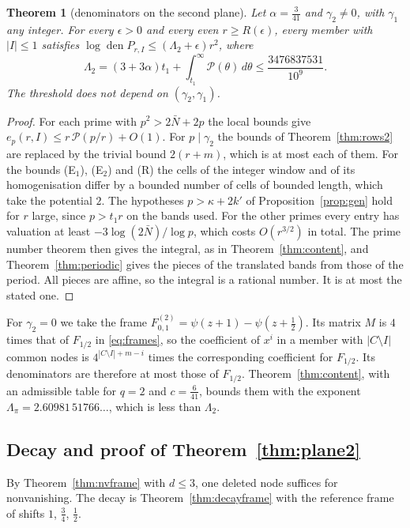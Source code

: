 \documentclass[11pt]{amsart}
\newtheorem{theorem}{Theorem}[section]
\theoremstyle{definition}
\theoremstyle{remark}
\numberwithin{equation}{section}
\newcommand{\den}{\operatorname{den}}
\begin{document}
\begin{theorem}[denominators on the second plane]\label{thm:content2}
Let $\alpha=\frac3{41}$ and $\gamma_2\ne0$, with $\gamma_1$ any integer. For every $\epsilon>0$ and every even
$r\ge R(\epsilon)$, every member with $|I|\le1$ satisfies $\log\den P_{r,I}\le(\Lambda_2+\epsilon)r^2$, where
\[
 \Lambda_2=(3+3\alpha)t_1+\int_{t_1}^\infty\mathcal P(\theta)\,d\theta\le\frac{3476837531}{10^9}.
\]
The threshold does not depend on $(\gamma_2,\gamma_1)$.
\end{theorem}
\begin{proof}
For each prime with $p^2>2\bar N+2p$ the local bounds give $e_p(r,I)\le r\,\mathcal P(p/r)+O(1)$. For $p\mid\gamma_2$ the
bounds of Theorem~\ref{thm:rows2} are replaced by the trivial bound $2(r+m)$, which is at most each of them. For the
bounds (E$_1$), (E$_2$) and (R) the cells of the integer window and of its homogenisation differ by a bounded number of
cells of bounded length, which take the potential $2$. The hypotheses $p>\kappa+2k'$ of Proposition~\ref{prop:gen} hold
for $r$ large, since $p>t_1r$ on the bands used. For the other primes every entry has valuation at least
$-3\log(2\bar N)/\log p$, which costs $O(r^{3/2})$ in total. The prime number theorem then gives the integral, as in
Theorem~\ref{thm:content}, and Theorem~\ref{thm:periodic} gives the pieces of the translated bands from those of the
period. All pieces are affine, so the integral is a rational number. It is at most the stated one.
\end{proof}

For $\gamma_2=0$ we take the frame $F^{(2)}_{0,1}=\psi(z+1)-\psi(z+\frac12)$. Its matrix $M$ is $4$ times that of
$F_{1/2}$ in \eqref{eq:frames}, so the coefficient of $x^i$ in a member with $|C\setminus I|$ common nodes is
$4^{|C\setminus I|+m-i}$ times the corresponding coefficient for $F_{1/2}$. Its denominators are therefore at most those
of $F_{1/2}$. Theorem~\ref{thm:content}, with an admissible table for $q=2$ and $c=\frac6{41}$, bounds them with the
exponent $\Lambda_\pi=2.60981\,51766\ldots$, which is less than $\Lambda_2$.

\subsection{Decay and proof of Theorem~\ref{thm:plane2}}
By Theorem~\ref{thm:nvframe} with $d\le3$, one deleted node suffices for nonvanishing. The decay is
Theorem~\ref{thm:decayframe} with the reference frame of shifts $1$, $\frac34$, $\frac12$.
\end{document}
